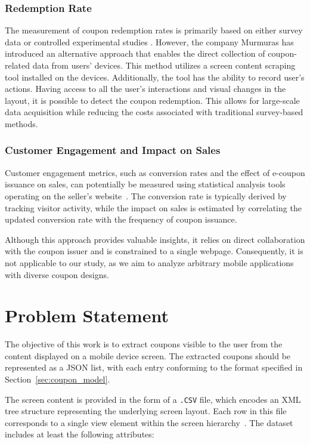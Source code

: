 \documentclass[licencjacka,en]{pracamgr}
\begin{document}
\subsubsection{Redemption Rate}  
The measurement of coupon redemption rates is primarily based on either survey data \cite{nayal2021} or controlled experimental studies \cite{danaher2015}. However, the company Murmuras \cite{murmuras} has introduced an alternative approach that enables the direct collection of coupon-related data from users' devices. This method utilizes a screen content scraping tool installed on the devices. Additionally, the tool has the ability to record user's actions.  Having access to all the user's interactions and visual changes in the layout, it is possible to detect the coupon redemption. This allows for large-scale data acquisition while reducing the costs associated with traditional survey-based methods.

\subsubsection{Customer Engagement and Impact on Sales}  

Customer engagement metrics, such as conversion rates and the effect of e-coupon issuance on sales, can potentially be measured using statistical analysis tools operating on the seller's website~\cite{seo2023}. The conversion rate is typically derived by tracking visitor activity, while the impact on sales is estimated by correlating the updated conversion rate with the frequency of coupon issuance.  

Although this approach provides valuable insights, it relies on direct collaboration with the coupon issuer and is constrained to a single webpage. Consequently, it is not applicable to our study, as we aim to analyze arbitrary mobile applications with diverse coupon designs.

\section{Problem Statement}

The objective of this work is to extract coupons visible to the user from the content displayed on a mobile device screen. The extracted coupons should be represented as a JSON list, with each entry conforming to the format specified in Section~\ref{sec:coupon_model}.  

The screen content is provided in the form of a \texttt{.CSV} file, which encodes an XML tree structure representing the underlying screen layout. Each row in this file corresponds to a single view element within the screen hierarchy~\cite{android_view}. The dataset includes at least the following attributes:  
\end{document}
